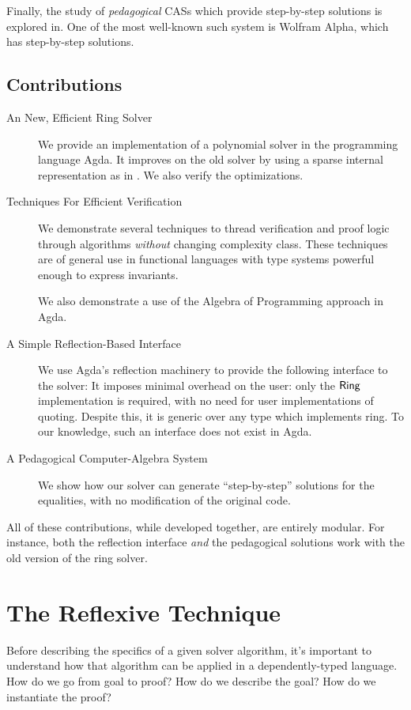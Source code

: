 \documentclass[draft, twocolumn]{article}
\theoremstyle{definition}
\theoremstyle{definition}
\begin{document}
Finally, the study of \emph{pedagogical} CASs which provide step-by-step
solutions is explored in\cite{lioubartsev_constructing_2016}. One of the most
well-known such system is Wolfram
Alpha\cite{wolfram_research_inc._wolframalpha_2019}, which has step-by-step
solutions\cite{the_development_team_step-by-step_2009}.
\subsection{Contributions}
\begin{description}
  \item[An New, Efficient Ring Solver]
    We provide an implementation of a polynomial solver in the programming
    language Agda. It improves on the old solver by using a sparse internal
    representation as in \cite{gregoire_proving_2005}. We also verify the
    optimizations.
  \item[Techniques For Efficient Verification] We demonstrate several techniques
    to thread verification and proof logic through algorithms \emph{without}
    changing complexity class. These techniques are of general use in functional
    languages with type systems powerful enough to express invariants.

    We also demonstrate a use of the Algebra of Programming approach in
    Agda\cite{mu_algebra_2009}.
  \item[A Simple Reflection-Based Interface] We use Agda's reflection machinery
    to provide the following interface to the solver:
    It imposes minimal overhead on the user: only the \(\AgdaDatatype{Ring}\)
    implementation is required, with no need for user implementations of
    quoting. Despite this, it is generic over any type which implements ring. To
    our knowledge, such an interface does not exist in Agda.
  \item[A Pedagogical Computer-Algebra System] We show how our solver can
    generate ``step-by-step'' solutions for the equalities, with no modification
    of the original code.
\end{description}
All of these contributions, while developed together, are entirely modular. For
instance, both the reflection interface \emph{and} the pedagogical solutions
work with the old version of the ring solver.
\section{The Reflexive Technique} \label{reflexive}
Before describing the specifics of a given solver algorithm, it's important to
understand how that algorithm can be applied in a dependently-typed language.
How do we go from goal to proof? How do we describe the goal? How do we
instantiate the proof?
\end{document}
